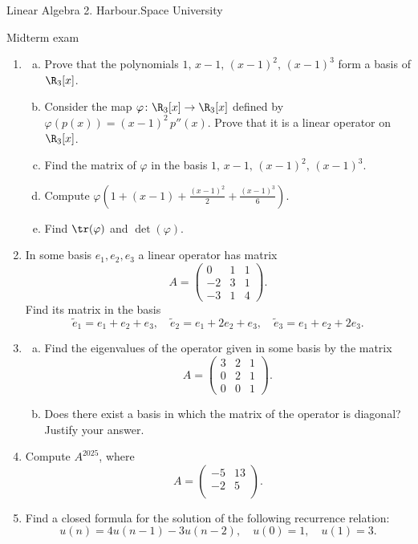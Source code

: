 
\begin{center}
Linear Algebra 2. Harbour.Space University

Midterm exam
\end{center}

\begin{enumerate}
\item \begin{enumerate}[(a)]
    \item Prove that the polynomials $1,\, x-1,\, (x-1)^2,\, (x-1)^3$ form a basis of $\R_3[x]$.
    \item Consider the map $\varphi\colon \R_3[x] \to \R_3[x]$ defined by $\varphi(p(x)) = (x-1)^2\, p''(x)$. Prove that it is a linear operator on $\R_3[x]$.
    \item Find the matrix of $\varphi$ in the basis $1,\, x-1,\, (x-1)^2,\, (x-1)^3$.
    \item Compute $\varphi\!\left(1 + (x-1) + \frac{(x-1)^2}{2} + \frac{(x-1)^3}{6}\right)$.
    \item Find $\tr(\varphi)$ and $\det(\varphi)$.
\end{enumerate}

    \item In some basis $e_1, e_2, e_3$ a linear operator has matrix
    $$
    A=\begin{pmatrix}
    0 & 1 & 1 \\
    -2 & 3 & 1 \\
    -3 & 1 & 4
    \end{pmatrix}.
    $$
    Find its matrix in the basis
    $$
    \tilde{e}_1=e_1+e_2+e_3,\quad \tilde{e}_2=e_1+2 e_2+ e_3,\quad \tilde{e}_3=e_1+e_2+2e_3.
    $$

\item \begin{enumerate}[(a)]
    \item Find the eigenvalues of the operator given in some basis by the matrix
    $$
    A = \begin{pmatrix}
    3 & 2 & 1 \\
    0 & 2 & 1 \\
    0 & 0 & 1
    \end{pmatrix}.
    $$
    \item Does there exist a basis in which the matrix of the operator is diagonal? Justify your answer.
\end{enumerate}

\item Compute $A^{2025}$, where 
$$
A = \begin{pmatrix}
    -5 & 13 \\
    -2 & 5\\
\end{pmatrix}.
$$

\item Find a closed formula for the solution of the following recurrence relation:
$$
u(n)=4 u(n-1)-3 u(n-2), \quad u(0)=1, \quad u(1)=3.
$$

\end{enumerate}